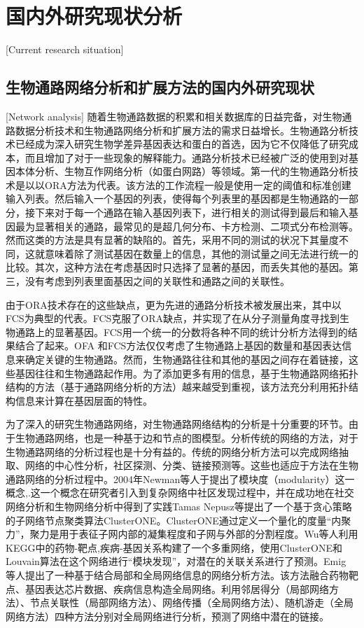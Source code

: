 \section{国内外研究现状分析}[Current research situation]
\subsection{生物通路网络分析和扩展方法的国内外研究现状}[Network analysis]
 随着生物通路数据的积累和相关数据库的日益完备，对生物通路数据分析技术和生物通路网络分析和扩展方法的需求日益增长。生物通路分析技术已经成为深入研究生物学差异基因表达和蛋白的首选，因为它不仅降低了研究成本，而且增加了对于一些现象的解释能力。通路分析技术已经被广泛的使用到对基因本体分析、生物互作网络分析（如蛋白网路）等领域。第一代的生物通路分析技术是以以ORA\cite{goeman2007analyzing}方法为代表。该方法的工作流程一般是使用一定的阈值和标准创建输入列表。然后输入一个基因的列表，使得每个列表里的基因都是生物通路的一部分，接下来对于每一个通路在输入基因列表下，进行相关的测试得到最后和输入基因最为显著相关的通路，最常见的是超几何分布、卡方检测、二项式分布检测等。然而这类的方法是具有显著的缺陷的。首先，采用不同的测试的状况下其量度不同，这就意味着除了测试基因在数量上的信息，其他的测试量之间无法进行统一的比较。其次，这种方法在考虑基因时只选择了显著的基因，而丢失其他的基因。第三，没有考虑到列表里面基因之间的关联性和通路之间的关联性。

 由于ORA技术存在的这些缺点，更为先进的通路分析技术被发展出来，其中以FCS\cite{lee2011prioritizing}为典型的代表。FCS克服了ORA缺点，并实现了在从分子测量角度寻找到生物通路上的显著基因。FCS用一个统一的分数将各种不同的统计分析方法得到的结果结合了起来。OFA 和FCS方法仅仅考虑了生物通路上基因的数量和基因表达信息来确定关键的生物通路。然而，生物通路往往和其他的基因之间存在着链接，这些基因往往和生物通路起作用。为了添加更多有用的信息，基于生物通路网络拓扑结构的方法（基于通路网络分析的方法）越来越受到重视，该方法充分利用拓扑结构信息来计算在基因层面的特性。

为了深入的研究生物通路网络，对生物通路网络结构的分析是十分重要的环节。由于生物通路网络，也是一种基于边和节点的图模型。分析传统的网络的方法，对于生物通路网络的分析过程也是十分有益的。传统的网络分析方法可以完成网络抽取、网络的中心性分析，社区探测、分类、链接预测等。这些也适应于方法在生物通路网络的分析过程中。2004年Newman\cite{newman2006modularity}等人于提出了模块度（modularity）这一概念,.这一个概念在研究者引入到复杂网络中社区发现过程中，并在成功地在社交网络分析和生物网络分析中得到了实践Tamas Nepusz\cite{nepusz2012detecting}等提出了一个基于贪心策略的子网络节点聚类算法ClusterONE。ClusterONE通过定义一个量化的度量“内聚力”，聚力是用于表征子网内部的凝集程度和子网与外部的分割程度。Wu等人利用KEGG\cite{kanehisa2008kegg}中的药物-靶点,疾病-基因关系构建了一个多重网络，使用ClusterONE和Louvain\cite{blondel2008fast}算法在这个网络进行“模块发现”，对潜在的关联关系进行了预测。Emig \cite{emig2013drug}等人提出了一种基于结合局部和全局网络信息的网络分析方法。该方法融合药物靶点、基因表达芯片数据、疾病信息构造全局网络。利用邻居得分（局部网络方法）、节点关联性（局部网络方法）、网络传播（全局网络方法）、随机游走（全局网络方法）四种方法分别对全局网络进行分析，预测了网络中潜在的链接。

